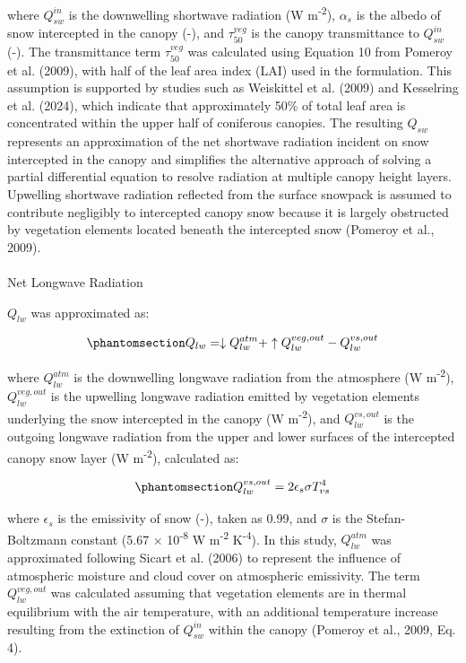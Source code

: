 \documentclass[
  letterpaper,
]{tex/uofsthesis-cs}
\makeatletter
\let\oldparagraph\paragraph
\renewcommand{\paragraph}{
    \@ifstar
      \xxxParagraphStar
      \xxxParagraphNoStar
  }
\newcommand{\xxxParagraphStar}[1]{\oldparagraph*{#1}\mbox{}}
\newcommand{\xxxParagraphNoStar}[1]{\oldparagraph{#1}\mbox{}}
\makeatother
\begin{document}
where \(Q_{sw}^{in}\) is the downwelling shortwave radiation (W
m\textsuperscript{-2}), \(\alpha_s\) is the albedo of snow intercepted
in the canopy (-), and \(\tau_{50}^{veg}\) is the canopy transmittance
to \(Q_{sw}^{in}\) (-). The transmittance term \(\tau_{50}^{veg}\) was
calculated using Equation 10 from Pomeroy et al. (2009), with half of
the leaf area index (LAI) used in the formulation. This assumption is
supported by studies such as Weiskittel et al. (2009) and Kesselring et
al. (2024), which indicate that approximately 50\% of total leaf area is
concentrated within the upper half of coniferous canopies. The resulting
\(Q_{sw}\) represents an approximation of the net shortwave radiation
incident on snow intercepted in the canopy and simplifies the
alternative approach of solving a partial differential equation to
resolve radiation at multiple canopy height layers. Upwelling shortwave
radiation reflected from the surface snowpack is assumed to contribute
negligibly to intercepted canopy snow because it is largely obstructed
by vegetation elements located beneath the intercepted snow (Pomeroy et
al., 2009).

\paragraph{Net Longwave Radiation}\label{net-longwave-radiation}

\(Q_{lw}\) was approximated as:

\begin{equation}\phantomsection\label{eq-lw-05}{
Q_{lw} = \downarrow Q_{lw}^{atm} + \uparrow Q_{lw}^{veg, out} - Q_{lw}^{vs, out}
}\end{equation}

where \(Q_{lw}^{atm}\) is the downwelling longwave radiation from the
atmosphere (W m\textsuperscript{-2}), \(Q_{lw}^{veg,out}\) is the
upwelling longwave radiation emitted by vegetation elements underlying
the snow intercepted in the canopy (W m\textsuperscript{-2}), and
\(Q_{lw}^{vs,out}\) is the outgoing longwave radiation from the upper
and lower surfaces of the intercepted canopy snow layer (W
m\textsuperscript{-2}), calculated as:

\begin{equation}\phantomsection\label{eq-lw-vs-05}{
Q_{lw}^{vs, out} = 2 \epsilon_{s} \sigma T_{vs}^4
}\end{equation}

where \(\epsilon_s\) is the emissivity of snow (-), taken as 0.99, and
\(\sigma\) is the Stefan-Boltzmann constant (5.67 ×
10\textsuperscript{-8} W m\textsuperscript{-2} K\textsuperscript{-4}).
In this study, \(Q_{lw}^{atm}\) was approximated following Sicart et al.
(2006) to represent the influence of atmospheric moisture and cloud
cover on atmospheric emissivity. The term \(Q_{lw}^{veg,out}\) was
calculated assuming that vegetation elements are in thermal equilibrium
with the air temperature, with an additional temperature increase
resulting from the extinction of \(Q_{sw}^{in}\) within the canopy
(Pomeroy et al., 2009, Eq. 4).
\end{document}

